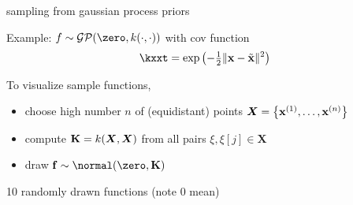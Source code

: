 \documentclass[11pt,compress,t,notes=noshow, xcolor=table]{beamer}
\begin{document}
\begin{framei}[sep=L]{sampling from gaussian process priors}
\item Example: $f \sim \gpzk$ with cov function
$$ \kxxt = \exp\left(-\tfrac{1}{2}\xxtnorm^2\right)$$
\item To visualize sample functions, 
\begin{itemize}
\item choose high number $n$ of (equidistant) points $\bm{X} = \left\{ \mathbf{x}^{(1)}, \ldots, \mathbf{x}^{(n)}\right\}$
  \item compute $\mathbf{K} = k(\bm{X}, \bm{X})$ from all pairs $\xi, \xi[j] \in \bm{X}$ 
  \item draw $\fv \sim \nzk$ 
\end{itemize}
\item 10 randomly drawn functions (note 0 mean)
\vfill
{}
\end{framei}

\endlecture
\end{document}
